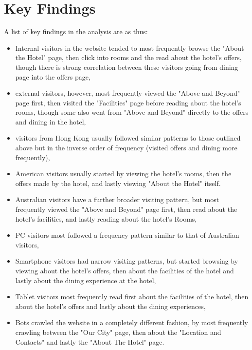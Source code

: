 \section{Key Findings}
\label{sec:key_findings}

A list of key findings in the analysis are as thus:

\begin{itemize}
  \item Internal visitors in the website tended to most frequently browse the "About the Hotel" page, then click into rooms and the read about the hotel's offers, though there is strong correlation between these visitors going from dining page into the offers page,
  \item external visitors, however, most frequently viewed the "Above and Beyond" page first, then visited the "Facilities" page before reading about the hotel's rooms, though some also went from "Above and Beyond" directly to the offers and dining in the hotel,
  \item visitors from Hong Kong usually followed similar patterns to those outlined above but in the inverse order of frequency (visited offers and dining more frequently),
  \item American visitors usually started by viewing the hotel's rooms, then the offers made by the hotel, and lastly viewing "About the Hotel" itself.
  \item Australian visitors have a further broader visiting pattern, but most frequently viewed the "Above and Beyond" page first, then read about the hotel's facilities, and lastly reading about the hotel's Rooms,
  \item PC visitors most followed a frequency pattern similar to that of Australian visitors,
  \item Smartphone visitors had narrow visiting patterns, but started browsing by viewing about the hotel's offers, then about the facilities of the hotel and lastly about the dining experience at the hotel,
  \item Tablet visitors most frequently read first about the facilities of the hotel, then about the hotel's offers and lastly about the dining experiences,
  \item Bots crawled the website in a completely different fashion, by most frequently crawling between the "Our City" page, then about the "Location and Contacts" and lastly the "About The Hotel" page.
\end{itemize}